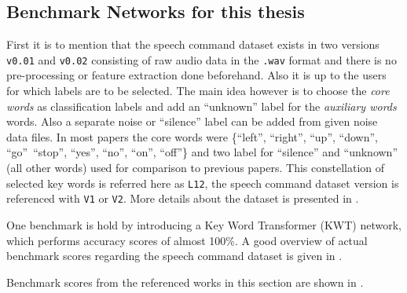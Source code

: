 \subsection{Benchmark Networks for this thesis}\label{sec:prev_kws_benchmark}
First it is to mention that the speech command dataset \cite{Warden2018} exists in two versions \texttt{v0.01} and \texttt{v0.02} consisting of raw audio data in the \texttt{.wav} format and there is no pre-processing or feature extraction done beforehand.
Also it is up to the users for which labels are to be selected.
The main idea however is to choose the \emph{core words} as classification labels and add an \enquote{unknown} label for the \emph{auxiliary words} words.
Also a separate noise or \enquote{silence} label can be added from given noise data files.
In most papers the core words were \{\enquote{left},  \enquote{right}, \enquote{up}, \enquote{down}, \enquote{go}\, \enquote{stop}, \enquote{yes}, \enquote{no}, \enquote{on}, \enquote{off}\} and two label for \enquote{silence} and \enquote{unknown} (all other words) used for comparison to previous papers.
This constellation of selected key words is referred here as \texttt{L12}, the speech command dataset version is referenced with \texttt{V1} or \texttt{V2}.
More details about the dataset is presented in .

One benchmark is hold by \cite{Berg2021} introducing a Key Word Transformer (KWT) network, which performs accuracy scores of almost 100\%.
A good overview of actual benchmark scores regarding the speech command dataset is given in \cite{PaperswithcodeKWS}.

Benchmark scores from the referenced works in this section are shown in .




